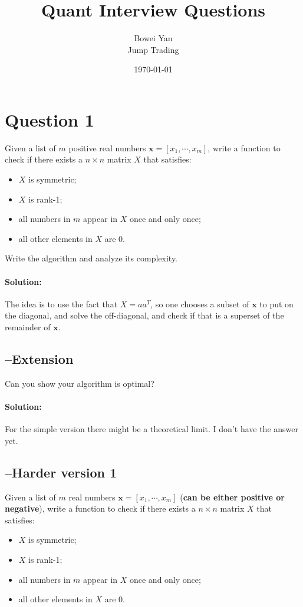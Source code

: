 \documentclass[11pt]{article}
\begin{document}
\title{Quant Interview Questions}
\date{\today}
\author{Bowei Yan\\ Jump Trading}
\maketitle

\section*{Question 1}
Given a list of $m$ positive real numbers $\bm{x}=[x_1,\cdots, x_m]$, write a function to check if there exists a $n\times n$ matrix $X$ that satisfies:
\begin{itemize}
\item $X$ is symmetric;
\item $X$ is rank-1;
\item all numbers in $m$ appear in $X$ once and only once;
\item all other elements in $X$ are 0.
\end{itemize}
Write the algorithm and analyze its complexity.
\paragraph{Solution:}
The idea is to use the fact that $X=aa^T$, so one chooses a subset of $\bm{x}$ to put on the diagonal, and solve the off-diagonal, and check if that is a superset of the remainder of $\bm{x}$.

\subsection*{--Extension}
Can you show your algorithm is optimal?
\paragraph{Solution:}
For the simple version there might be a theoretical limit. I don't have the answer yet.

\subsection*{--Harder version 1}
Given a list of $m$ real numbers $\bm{x}=[x_1,\cdots, x_m]$ ({\bf can be either positive or negative}), write a function to check if there exists a $n\times n$ matrix $X$ that satisfies:
\begin{itemize}
\item $X$ is symmetric;
\item $X$ is rank-1;
\item all numbers in $m$ appear in $X$ once and only once;
\item all other elements in $X$ are 0.
\end{itemize}
\end{document}
